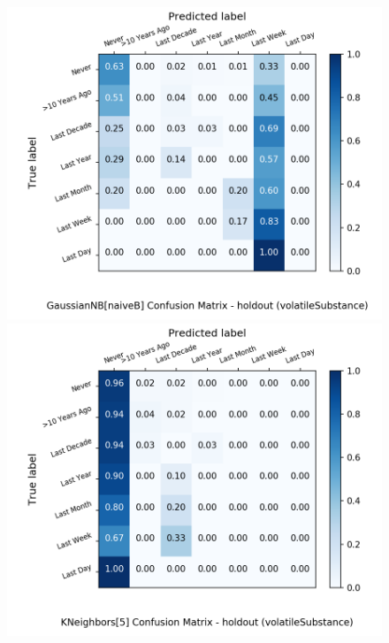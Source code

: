 \begin{figure}[H]
	\begin{minipage}[b]{0.32\textwidth}
		\includegraphics[width=1.1\textwidth]{Plots/drugs/volatileSubstance_GaussianNB_naiveB_balance_False_holdout.png}
	\end{minipage}
	\begin{minipage}[b]{0.32\textwidth}
		\includegraphics[width=1.1\textwidth]{Plots/drugs/volatileSubstance_KNeighbors_5_balance_False_holdout.png}
  \end{minipage}
	\begin{minipage}[b]{0.32\textwidth}

\end{minipage}
\end{figure}
